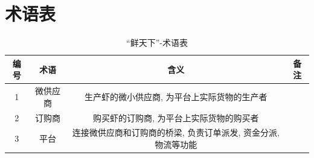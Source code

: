 \section{术语表}

\begin{table}[h] %
	\centering
        \label{tab:glossary}
        \caption{“鲜天下”-术语表}
		\begin{tabular}{*{4}{c}}
			\toprule
	 		编号 & 术语 & 含义 & 备注\\
            \midrule
            1 & 微供应商 & 生产虾的微小供应商, 为平台上实际货物的生产者 \\
            2 & 订购商 & 购买虾的订购商, 为平台上实际货物的购买者 \\
            3 & 平台 & 连接微供应商和订购商的桥梁, 负责订单派发, 资金分派, 物流等功能\\
			\bottomrule
		\end{tabular}
\end{table}

